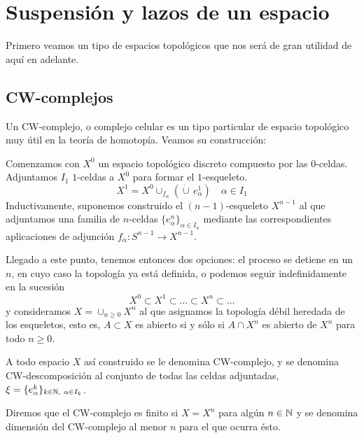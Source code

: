 \chapter{Suspensión y lazos de un espacio}
Primero veamos un tipo de espacios topológicos que nos será de gran utilidad de aquí en adelante.
\section{CW-complejos}
Un CW-complejo, o complejo celular es un tipo particular de espacio topológico muy útil en la teoría de homotopía. Veamos su construcción: \par
Comenzamos con $X^0$ un espacio topológico discreto compuesto por las $0$-celdas. Adjuntamos $I_1$ $1$-celdas a $X^0$ para formar el $1$-esqueleto.
\[ X^1 = X^0 \cup_{f_\alpha} \left( \dot{\cup} \, e_\alpha^1 \right) \quad \alpha \in I_1\]
Inductivamente, suponemos construido el $(n-1)$-esqueleto $X^{n-1}$ al que adjuntamos una familia de $n$-celdas $\{e_\alpha^n\}_{\alpha \in I_n}$ mediante las correspondientes aplicaciones de adjunción $f_\alpha : S^{n-1} \longrightarrow X^{n-1}$. \par 
Llegado a este punto, tenemos entonces dos opciones: el proceso se detiene en un $n$, en cuyo caso la topología ya está definida, o podemos seguir indefinidamente en la sucesión
\[ X^0 \subset X^1 \subset \ldots \subset X^n \subset \ldots \]
y consideramos $\displaystyle X = \cup_{n \geq 0} X^n $ al que asignamos la topología débil heredada de los esqueletos, esto es, $A \subset X$ es abierto si y sólo si $A \cap X^n$ es abierto de $X^n$ para todo $n \geq 0$. \par 
A todo espacio $X$ así construido se le denomina CW-complejo, y se denomina CW-descomposición al conjunto de todas las celdas adjuntadas, $\xi = \{e^k_\alpha\}_{k \in \mathbb{N}, \ \alpha \in I_k}$. \par
Diremos que el CW-complejo es finito si $X = X^n$ para algún $n \in \mathbb{N}$ y se denomina dimensión del CW-complejo al menor $n$ para el que ocurra ésto.
